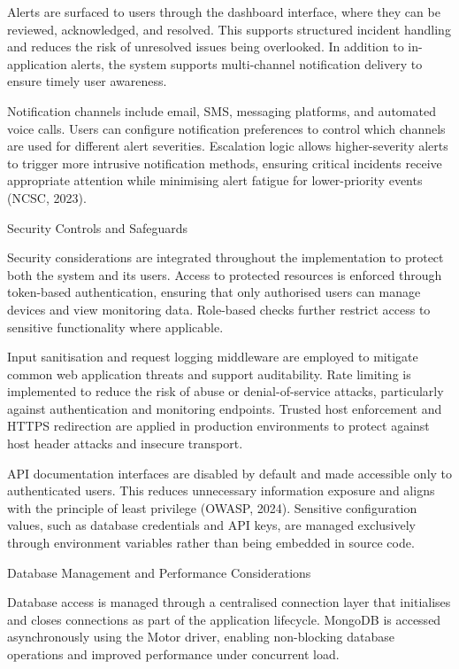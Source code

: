 Alerts are surfaced to users through the dashboard interface, where they can be reviewed, acknowledged, and resolved. This supports structured incident handling and reduces the risk of unresolved issues being overlooked. In addition to in-application alerts, the system supports multi-channel notification delivery to ensure timely user awareness.

Notification channels include email, SMS, messaging platforms, and automated voice calls. Users can configure notification preferences to control which channels are used for different alert severities. Escalation logic allows higher-severity alerts to trigger more intrusive notification methods, ensuring critical incidents receive appropriate attention while minimising alert fatigue for lower-priority events (NCSC, 2023).

Security Controls and Safeguards

Security considerations are integrated throughout the implementation to protect both the system and its users. Access to protected resources is enforced through token-based authentication, ensuring that only authorised users can manage devices and view monitoring data. Role-based checks further restrict access to sensitive functionality where applicable.

Input sanitisation and request logging middleware are employed to mitigate common web application threats and support auditability. Rate limiting is implemented to reduce the risk of abuse or denial-of-service attacks, particularly against authentication and monitoring endpoints. Trusted host enforcement and HTTPS redirection are applied in production environments to protect against host header attacks and insecure transport.

API documentation interfaces are disabled by default and made accessible only to authenticated users. This reduces unnecessary information exposure and aligns with the principle of least privilege (OWASP, 2024). Sensitive configuration values, such as database credentials and API keys, are managed exclusively through environment variables rather than being embedded in source code.

Database Management and Performance Considerations

Database access is managed through a centralised connection layer that initialises and closes connections as part of the application lifecycle. MongoDB is accessed asynchronously using the Motor driver, enabling non-blocking database operations and improved performance under concurrent load.

